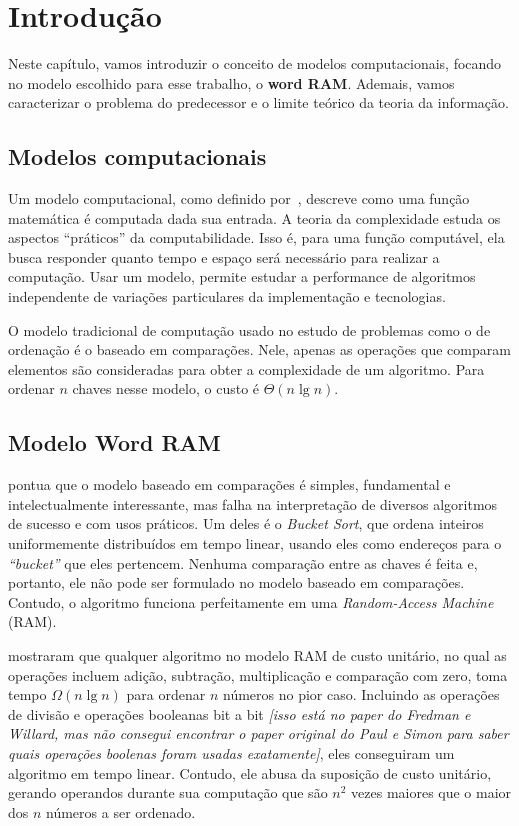 \chapter{Introdução}
\label{cap:introducao}

Neste capítulo, vamos introduzir o conceito de modelos computacionais, focando
no modelo escolhido para esse trabalho, o \textbf{word RAM}. Ademais, vamos
caracterizar o problema do predecessor e o limite teórico da teoria da
informação. 

\section{Modelos computacionais}

Um modelo computacional, como definido por~\cite{FM09}, descreve como uma função
matemática é computada dada sua entrada. A teoria da complexidade estuda os
aspectos ``práticos'' da computabilidade. Isso é, para uma função computável,
ela busca responder quanto tempo e espaço será necessário para realizar a
computação. Usar um modelo, permite estudar a performance de algoritmos
independente de variações particulares da implementação e tecnologias.

O modelo tradicional de computação usado no estudo de problemas como o de
ordenação é o baseado em comparações. Nele, apenas as operações que comparam
elementos são consideradas para obter a complexidade de um algoritmo. Para
ordenar $n$ chaves nesse modelo, o custo é $\Theta(n \lg n)$. 

\section{Modelo Word RAM}

\cite{HT98} pontua que o modelo baseado em comparações é simples, fundamental e
intelectualmente interessante, mas falha na interpretação de diversos algoritmos
de sucesso e com usos práticos. Um deles é o \textit{Bucket Sort}, que ordena
inteiros uniformemente distribuídos em tempo linear, usando eles como endereços
para o \textit{``bucket''} que eles pertencem. Nenhuma comparação entre as
chaves é feita e, portanto, ele não pode ser formulado no modelo baseado em
comparações. Contudo, o algoritmo funciona perfeitamente em uma
\textit{Random-Access Machine} (RAM).  

\cite{PS80} mostraram que qualquer algoritmo no modelo RAM de custo unitário, no
qual as operações incluem adição, subtração, multiplicação e comparação com
zero, toma tempo $\Omega(n \lg n)$ para ordenar $n$ números no pior caso.
Incluindo as operações de divisão e operações booleanas bit a bit \textit{[isso
está no paper do Fredman e Willard, mas não consegui encontrar o paper original
do Paul e Simon para saber quais operações boolenas foram usadas exatamente]},
eles conseguiram um algoritmo em tempo linear. Contudo, ele abusa da suposição
de custo unitário, gerando operandos durante sua computação que são $n^2$ vezes
maiores que o maior dos $n$ números a ser ordenado.

